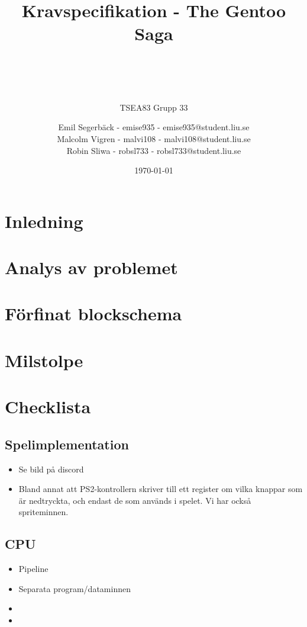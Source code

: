\documentclass[a4paper,titlepage]{article}
\title{
    \textbf{Kravspecifikation - The Gentoo Saga} \\
    \subtitle{TSEA83 Grupp 33}
    \author{
        Emil Segerbäck - emise935 - emise935@student.liu.se\\Malcolm Vigren -
        malvi108 - malvi108@student.liu.se \\Robin Sliwa - robsl733 -
        robsl733@student.liu.se
            }
    \\
    \date{\today}
        }
\begin{document}
    \maketitle
    \newpage

\section{Inledning}

\newpage
\section{Analys av problemet}

\newpage
\section{Förfinat blockschema}

\newpage
\section{Milstolpe}
 
\newpage
\section{Checklista}
    \subsection{Spelimplementation}
        \begin{itemize}
            \item Se bild på discord
            \item Bland annat att PS2-kontrollern skriver till ett register om
                vilka knappar som är nedtryckta, och endast de som används i
                spelet. Vi har också spriteminnen.
        \end{itemize}
    \subsection{CPU}
        \begin{itemize}
            \item Pipeline
            \item Separata program/dataminnen
            \item 
            \item  
        \end{itemize}
\end{document}
